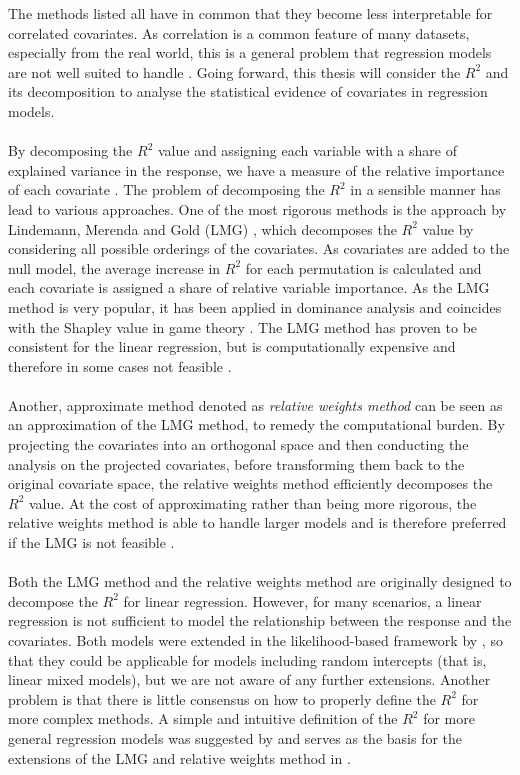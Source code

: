 The methods listed all have in common that they become less interpretable for correlated covariates. As correlation is a common feature of many datasets, especially from the real world, this is a general problem that regression models are not well suited to handle \citep{Gromping_2015}. Going forward, this thesis will consider the $R^2$ and its decomposition to analyse the statistical evidence of covariates in regression models.
\\
\\
By decomposing the $R^2$ value and assigning each variable with a share of explained variance in the response, we have a measure of the relative importance of each covariate \citep{gromping_relaimpo}. The problem of decomposing the $R^2$ in a sensible manner has lead to various approaches. One of the most rigorous methods is the approach by Lindemann, Merenda and Gold (LMG) \citep{Lindeman1980}, which decomposes the $R^2$ value by considering all possible orderings of the covariates. As covariates are added to the null model, the average increase in $R^2$ for each permutation is calculated and each covariate is assigned a share of relative variable importance. As the LMG method is very popular, it has been applied in dominance analysis \citep{budescu1993dominance} and coincides with the Shapley value in game theory \citep{Shapley1953StochasticG,Lipovetsky_GameTheory}. The LMG method has proven to be consistent for the linear regression, but is computationally expensive and therefore in some cases not feasible \citep{gromping_relaimpo}. 
\\
\\
Another, approximate method denoted as \textit{relative weights method} \citep{johnson_minimization_trace, Fabbris1980, Genizi_relative_weights} can be seen as an approximation of the LMG method, to remedy the computational burden. By projecting the covariates into an orthogonal space and then conducting the analysis on the projected covariates, before transforming them back to the original covariate space, the relative weights method efficiently decomposes the $R^2$ value. At the cost of approximating rather than being more rigorous, the relative weights method is able to handle larger models and is therefore preferred if the LMG is not feasible \citep{gromping_relaimpo}.
\\
\\ 
Both the LMG method and the relative weights method are originally designed to decompose the $R^2$ for linear regression. However, for many scenarios, a linear regression is not sufficient to model the relationship between the response and the covariates. Both models were extended in the likelihood-based framework by \citet{matre}, so that they could be applicable for models including random intercepts (that is, linear mixed models), but we are not aware of any further extensions. Another problem is that there is little consensus on how to properly define the $R^2$ for more complex methods. A simple and intuitive definition of the $R^2$ for more general regression models was suggested by \citet{nakagawa2013general} and serves as the basis for the extensions of the LMG and relative weights method in \citet{matre}. 
